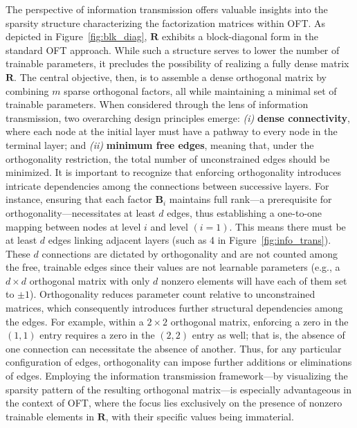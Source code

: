 The perspective of information transmission offers valuable insights into the sparsity structure characterizing the factorization matrices within OFT. As depicted in Figure~\ref{fig:blk_diag}, $\bm{R}$ exhibits a block-diagonal form in the standard OFT approach. While such a structure serves to lower the number of trainable parameters, it precludes the possibility of realizing a fully dense matrix $\bm{R}$. The central objective, then, is to assemble a dense orthogonal matrix by combining $m$ sparse orthogonal factors, all while maintaining a minimal set of trainable parameters. When considered through the lens of information transmission, two overarching design principles emerge: \emph{(i)} \textbf{dense connectivity}, where each node at the initial layer must have a pathway to every node in the terminal layer; and \emph{(ii)} \textbf{minimum free edges}, meaning that, under the orthogonality restriction, the total number of unconstrained edges should be minimized. It is important to recognize that enforcing orthogonality introduces intricate dependencies among the connections between successive layers. For instance, ensuring that each factor $\bm{B}_i$ maintains full rank—a prerequisite for orthogonality—necessitates at least $d$ edges, thus establishing a one-to-one mapping between nodes at level $i$ and level $(i=1)$. This means there must be at least $d$ edges linking adjacent layers (such as 4 in Figure~\ref{fig:info_trans}). These $d$ connections are dictated by orthogonality and are not counted among the free, trainable edges since their values are not learnable parameters (e.g., a $d\times d$ orthogonal matrix with only $d$ nonzero elements will have each of them set to $\pm 1$). Orthogonality reduces parameter count relative to unconstrained matrices, which consequently introduces further structural dependencies among the edges. For example, within a $2\times 2$ orthogonal matrix, enforcing a zero in the $(1,1)$ entry requires a zero in the $(2,2)$ entry as well; that is, the absence of one connection can necessitate the absence of another. Thus, for any particular configuration of edges, orthogonality can impose further additions or eliminations of edges. Employing the information transmission framework—by visualizing the sparsity pattern of the resulting orthogonal matrix—is especially advantageous in the context of OFT, where the focus lies exclusively on the presence of nonzero trainable elements in $\bm{R}$, with their specific values being immaterial.


